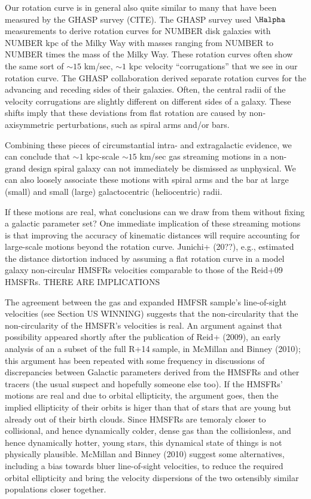 Our rotation curve is in general also quite similar to many that have been measured by the GHASP survey (CITE). 
The GHASP survey used $\Halpha$ measurements to derive rotation curves for NUMBER disk galaxies with NUMBER kpc of the Milky Way with masses ranging from NUMBER to NUMBER times the mass of the Milky Way.
These rotation curves often show the same sort of $\sim 15$ km/sec, $\sim 1$ kpc velocity ``corrugations'' that we see in our rotation curve. 
The GHASP collaboration derived separate rotation curves for the advancing and receding sides of their galaxies.
Often, the central radii of the velocity corrugations are slightly different on different sides of a galaxy.
These shifts imply that these deviations from flat rotation are caused by non-axisymmetric perturbations, such as spiral arms and/or bars.

Combining these pieces of circumstantial intra- and extragalactic evidence, we can conclude that $\sim 1$ kpc-scale $\sim 15$ km/sec gas streaming motions in a non-grand design spiral galaxy can not immediately be dismissed as unphysical. 
We can also loosely associate these motions with spiral arms and the bar at large (small) and small (large) galactocentric (heliocentric) radii.

If these motions are real, what conclusions can we draw from them without fixing a galactic parameter set? One immediate implication of these streaming motions is that improving the accuracy of kinematic distances will require accounting for large-scale motions beyond the rotation curve. Junichi+ (20??), e.g., estimated the distance distortion induced by assuming a flat rotation curve in a model galaxy non-circular HMSFRs velocities comparable to those of the Reid+09 HMSFRs. 
THERE ARE IMPLICATIONS

The agreement between the gas and expanded HMFSR sample's line-of-sight velocities (see Section US WINNING) suggests that the non-circularity that the non-circularity of the HMSFR's velocities is real. 
An argument against that possibility appeared shortly after the publication of Reid+ (2009), an early analysis of an a subset of the full R+14 sample, in McMillan and Binney (2010); this argument has been repeated with some frequency in discussions of discrepancies between Galactic parameters derived from the HMSFRs and other tracers (the usual suspect and hopefully someone else too).
If the HMSFRs' motions are real and due to orbital ellipticity, the argument goes, then the implied ellipticity of their orbits is higer than that of stars that are young but already out of their birth clouds. 
Since HMSFRs are temoraly closer to collisional, and hence dynamically colder, dense gas than the collisionless, and hence dynamically hotter, young stars, this dynamical state of things is not physically plausible. 
McMillan and Binney (2010) suggest some alternatives, including a bias towards bluer line-of-sight velocities, to reduce the required orbital ellipticity and bring the velocity dispersions of the two ostensibly similar populations closer together.

